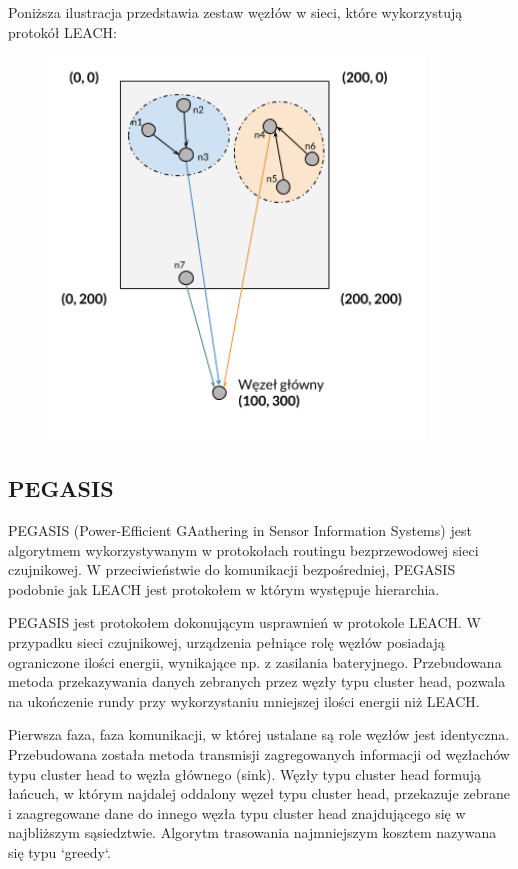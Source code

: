 \documentclass[a4paper,12pt,twoside,openany]{report}
\begin{document}
Poniższa ilustracja przedstawia zestaw węzłów w sieci, które wykorzystują protokół LEACH:

\begin{figure}[H]
 \centering
 \includegraphics[width=10cm]{images/komunikacja_leach.png} 
\end{figure}

\subsection{PEGASIS}

PEGASIS (Power-Efficient GAathering in Sensor Information Systems) jest algorytmem wykorzystywanym w protokołach routingu bezprzewodowej sieci czujnikowej.
W przeciwieństwie do komunikacji bezpośredniej, PEGASIS podobnie jak LEACH jest protokołem w którym występuje hierarchia.

PEGASIS jest protokołem dokonującym usprawnień w protokole LEACH. W przypadku sieci czujnikowej, urządzenia pełniące rolę węzłów posiadają ograniczone ilości energii, wynikające np. z zasilania bateryjnego.
Przebudowana metoda przekazywania danych zebranych przez węzły typu cluster head, pozwala na ukończenie rundy przy wykorzystaniu mniejszej ilości energii niż LEACH.

Pierwsza faza, faza komunikacji, w której ustalane są role węzłów jest identyczna. Przebudowana została metoda transmisji zagregowanych informacji od węzłachów typu cluster head to węzła głównego (sink).
Węzły typu cluster head formują łańcuch, w którym najdalej oddalony węzeł typu cluster head, przekazuje zebrane i zaagregowane dane do innego węzła typu cluster head znajdującego się w najbliższym 
sąsiedztwie. Algorytm trasowania najmniejszym kosztem nazywana się typu `greedy`. 
\end{document}
